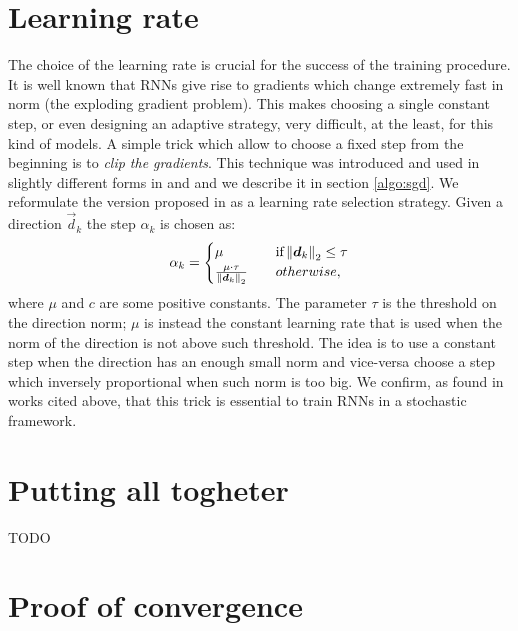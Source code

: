 \section{Learning rate}

The choice of the learning rate is crucial for the success of the training procedure. It is well known that RNNs give rise to gradients which change extremely fast in norm (the exploding gradient problem). This makes choosing a single constant step, or even designing an adaptive strategy, very difficult, at the least, for this kind of models. A simple trick which allow to choose a fixed step from the beginning is to \textit{clip the gradients}. This technique was introduced and used in slightly different forms in \cite{understandingExplodingGradients} and \cite{clippingMikolov} and we describe it in section \ref{algo:sgd}. We reformulate the version proposed in \cite{understandingExplodingGradients} as a learning rate selection strategy.
Given a direction $\vec{d}_k$ the step $\alpha_k$ is chosen as:
\begin{equation}
\alpha_k = 
\begin{cases}
	\mu  \quad &\mbox{if} \left\Vert \boldsymbol{d}_k \right\Vert_2 \leq \tau\\
	\frac{\mu \cdot \tau}{\left\Vert \boldsymbol{d}_k \right\Vert_2} \quad & otherwise,
\end{cases}
\end{equation}
where $\mu$ and $c$ are some positive constants. The parameter $\tau$ is the threshold on the direction norm; $\mu$ is instead the constant learning rate that is used when the norm of the direction is not above such threshold. The idea is to use a constant step when the direction has an enough small norm and vice-versa choose a step which inversely proportional when such norm is too big. We confirm, as found in works cited above, that this trick is essential to train RNNs in a stochastic framework.

\section{Putting all togheter}
TODO

\section{Proof of convergence}

